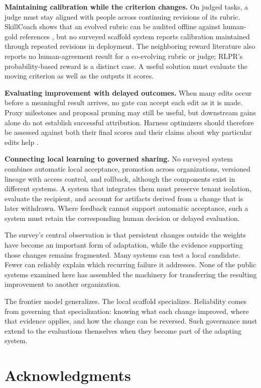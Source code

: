 \documentclass[
  11pt,
]{article}
\begin{document}
\textbf{Maintaining calibration while the criterion changes.} On judged tasks, a judge must stay aligned with people across continuing revisions of its rubric. SkillCoach shows that an evolved rubric can be audited offline against human-gold references \cite{zhu2026skillcoach}, but no surveyed scaffold system reports calibration maintained through repeated revisions in deployment. The neighboring reward literature also reports no human-agreement result for a co-evolving rubric or judge; RLPR's probability-based reward is a distinct case. A useful solution must evaluate the moving criterion as well as the outputs it scores.

\textbf{Evaluating improvement with delayed outcomes.} When many edits occur before a meaningful result arrives, no gate can accept each edit as it is made. Proxy milestones and proposal pruning may still be useful, but downstream gains alone do not establish successful attribution. Harness optimizers should therefore be assessed against both their final scores and their claims about why particular edits help \cite{ong2026harnesseval}.

\textbf{Connecting local learning to governed sharing.} No surveyed system combines automatic local acceptance, promotion across organizations, versioned lineage with access control, and rollback, although the components exist in different systems. A system that integrates them must preserve tenant isolation, evaluate the recipient, and account for artifacts derived from a change that is later withdrawn. Where feedback cannot support automatic acceptance, such a system must retain the corresponding human decision or delayed evaluation.

The survey's central observation is that persistent changes outside the weights have become an important form of adaptation, while the evidence supporting those changes remains fragmented. Many systems can test a local candidate. Fewer can reliably explain which recurring failure it addresses. None of the public systems examined here has assembled the machinery for transferring the resulting improvement to another organization.

The frontier model generalizes. The local scaffold specializes. Reliability comes from governing that specialization: knowing what each change improved, where that evidence applies, and how the change can be reversed. Such governance must extend to the evaluations themselves when they become part of the adapting system.

\section*{Acknowledgments}\label{acknowledgments}
\end{document}

